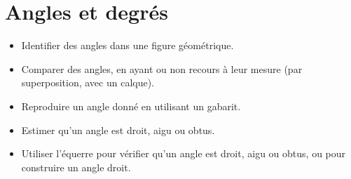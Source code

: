 \themaM
\graphicspath{{../Ch22_Les_angles/Images/}}

\chapter{Angles et degrés}
\label{C13}


\begin{prerequis}
   \begin{itemize}
      \item Identifier des angles dans une figure géométrique.
      \item Comparer des angles, en ayant ou non recours à leur mesure (par superposition, avec un calque).
      \item Reproduire un angle donné en utilisant un gabarit.
      \item Estimer qu’un angle est droit, aigu ou obtus.
      \item Utiliser l’équerre pour vérifier qu’un angle est droit, aigu ou obtus, ou pour construire un angle droit.
   \end{itemize}
\end{prerequis}

\vfill

